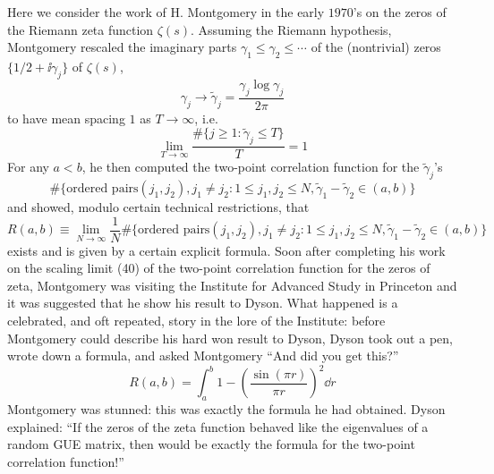 
Here we consider the work of H. Montgomery in the early $1970$’s on the zeros of the Riemann zeta function $\zeta(s)$. Assuming the Riemann hypothesis, Montgomery rescaled the imaginary parts $\gamma_1 \leq \gamma_2 \leq \cdots$ of the (nontrivial) zeros $\{ 1/2 + \ii \gamma_j\}$ of $\zeta(s)$,
\[
\gamma_j \rightarrow \tilde{\gamma}_j = \frac{\gamma_j \log{\gamma_j}}{2\pi}
\]
to have mean spacing $1$ as $T \rightarrow \infty$, i.e.
\[
\lim_{T \rightarrow \infty} \frac{\#\{j \geq 1 : \tilde{\gamma}_j \leq T\}}{T} = 1
\]
For any $a < b$, he then computed the two-point correlation function for the $\tilde{\gamma}_j$’s
\[
\#\{\text{ordered pairs} (j_1, j_2), j_1 \neq j_2 : 1 \leq j_1, j_2 \leq N, \tilde{\gamma}_1 - \tilde{\gamma}_2 \in (a, b)\}
\]
and showed, modulo certain technical restrictions, that
\[
R(a, b) \equiv \lim_{N \rightarrow \infty}\frac{1}{N} \#\{\text{ordered pairs} (j_1, j_2), j_1 \neq j_2 : 1 \leq j_1, j_2 \leq N, \tilde{\gamma}_1 - \tilde{\gamma}_2 \in (a, b)\}
\]
exists and is given by a certain explicit formula. Soon after completing his work on the scaling limit (40) of the two-point correlation function for the zeros of zeta, Montgomery was visiting the Institute for Advanced Study in Princeton and it was suggested that he show his result to Dyson. What happened is a celebrated, and oft repeated, story in the lore of the Institute: before Montgomery could describe his hard won result to Dyson, Dyson took out
a pen, wrote down a formula, and asked Montgomery “And did you get this?”
\[
R(a, b) = \int_{a}^{b} 1 - \left( \frac{\sin(\pi r)}{\pi r}\right)^2 \dd r
\]
Montgomery was stunned: this was exactly the formula he had obtained. Dyson explained: “If the zeros of the zeta function behaved like the eigenvalues of a random GUE matrix, then would be exactly the formula for the two-point correlation function!”